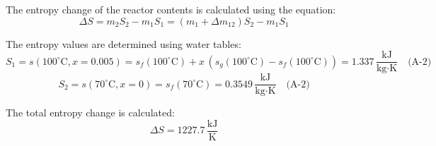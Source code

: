 The entropy change of the reactor contents is calculated using the equation:  
\[
\Delta S = m_2 S_2 - m_1 S_1 = (m_1 + \Delta m_{12}) S_2 - m_1 S_1
\]  

The entropy values are determined using water tables:  
\[
S_1 = s(100^\circ\text{C}, x=0.005) = s_f(100^\circ\text{C}) + x \, (s_g(100^\circ\text{C}) - s_f(100^\circ\text{C})) = 1.337 \, \frac{\text{kJ}}{\text{kg·K}} \quad \text{(A-2)}
\]  
\[
S_2 = s(70^\circ\text{C}, x=0) = s_f(70^\circ\text{C}) = 0.3549 \, \frac{\text{kJ}}{\text{kg·K}} \quad \text{(A-2)}
\]  

The total entropy change is calculated:  
\[
\Delta S = 1227.7 \, \frac{\text{kJ}}{\text{K}}
\]